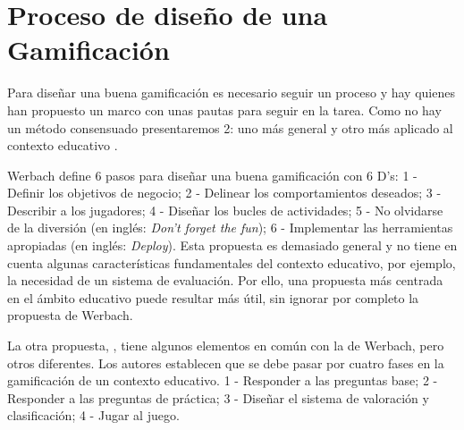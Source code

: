 

\section{Proceso de diseño de una Gamificación}

Para diseñar una buena gamificación es necesario seguir un proceso y hay quienes han propuesto un marco con unas pautas para seguir en la tarea. 
%
Como no hay un método consensuado presentaremos 2: uno más general  \citep{werbach2012win} y otro más aplicado al contexto educativo  \citep*{kapp2013gamification}.

Werbach define 6 pasos para diseñar una buena gamificación con 6 D's: 
1 - Definir los objetivos de negocio; 2 - Delinear los comportamientos deseados; 3 - Describir a los jugadores; 4 - Diseñar los bucles de actividades; 5 - No olvidarse de la diversión (en inglés: \textit{Don't forget the fun}); 6 - Implementar las herramientas apropiadas (en inglés: \textit{Deploy}).
%
Esta propuesta es demasiado general y no tiene en cuenta algunas características fundamentales del contexto educativo, por ejemplo, la necesidad de un sistema de evaluación.
%
Por ello, una propuesta más centrada en el ámbito educativo puede resultar más útil, sin ignorar por completo la propuesta de Werbach.

La otra propuesta,  \cite{kapp2013gamification}, tiene algunos elementos en común con la de Werbach, pero otros diferentes. 
%
Los autores establecen que se debe pasar por cuatro fases en la gamificación de un contexto educativo. 1 - Responder a las preguntas base; 2 - Responder a las preguntas de práctica; 3 - Diseñar el sistema de valoración y clasificación; 4 - Jugar al juego.

